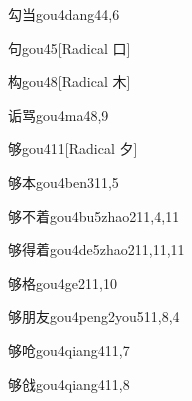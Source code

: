 \begin{verbete}{勾当}{gou4dang4}{4,6}
\end{verbete}

\begin{verbete}{句}{gou4}{5}[Radical 口]
\end{verbete}

\begin{verbete}{构}{gou4}{8}[Radical ⽊]
\end{verbete}

\begin{verbete}{诟骂}{gou4ma4}{8,9}
\end{verbete}

\begin{verbete}{够}{gou4}{11}[Radical ⼣]
\end{verbete}

\begin{verbete}{够本}{gou4ben3}{11,5}
\end{verbete}

\begin{verbete}{够不着}{gou4bu5zhao2}{11,4,11}
\end{verbete}

\begin{verbete}{够得着}{gou4de5zhao2}{11,11,11}
\end{verbete}

\begin{verbete}{够格}{gou4ge2}{11,10}
\end{verbete}

\begin{verbete}{够朋友}{gou4peng2you5}{11,8,4}
\end{verbete}

\begin{verbete}{够呛}{gou4qiang4}{11,7}
\end{verbete}

\begin{verbete}{够戗}{gou4qiang4}{11,8}
\end{verbete}

